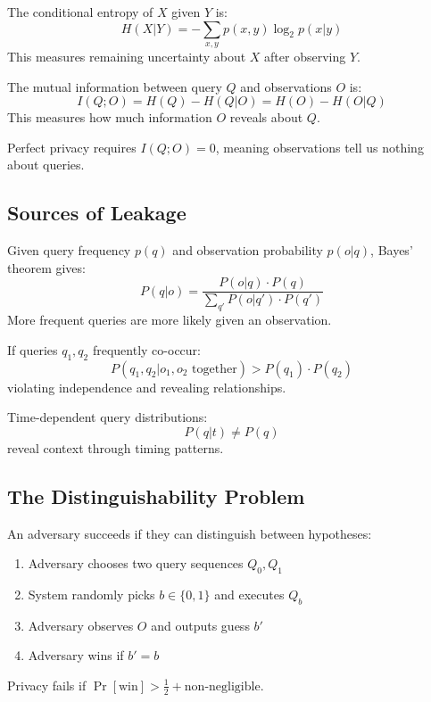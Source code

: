 \begin{definition}
The conditional entropy of $X$ given $Y$ is:
$$H(X|Y) = -\sum_{x,y} p(x,y) \log_2 p(x|y)$$
This measures remaining uncertainty about $X$ after observing $Y$.
\end{definition}

\begin{definition}
The mutual information between query $Q$ and observations $O$ is:
$$I(Q; O) = H(Q) - H(Q|O) = H(O) - H(O|Q)$$
This measures how much information $O$ reveals about $Q$.
\end{definition}

Perfect privacy requires $I(Q; O) = 0$, meaning observations tell us nothing about queries.

\subsection{Sources of Leakage}

\begin{theorem}
Given query frequency $p(q)$ and observation probability $p(o|q)$, Bayes' theorem gives:
$$P(q | o) = \frac{P(o|q) \cdot P(q)}{\sum_{q'} P(o|q') \cdot P(q')}$$
More frequent queries are more likely given an observation.
\end{theorem}

\begin{theorem}
If queries $q_1, q_2$ frequently co-occur:
$$P(q_1, q_2 | o_1, o_2 \text{ together}) > P(q_1) \cdot P(q_2)$$
violating independence and revealing relationships.
\end{theorem}

\begin{theorem}
Time-dependent query distributions:
$$P(q | t) \neq P(q)$$
reveal context through timing patterns.
\end{theorem}

\subsection{The Distinguishability Problem}

An adversary succeeds if they can distinguish between hypotheses:

\begin{definition}
\begin{enumerate}
\item Adversary chooses two query sequences $Q_0, Q_1$
\item System randomly picks $b \in \{0,1\}$ and executes $Q_b$
\item Adversary observes $O$ and outputs guess $b'$
\item Adversary wins if $b' = b$
\end{enumerate}
Privacy fails if $\Pr[\text{win}] > \frac{1}{2} + \text{non-negligible}$.
\end{definition}

